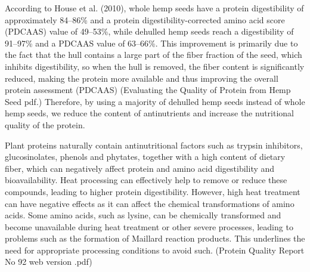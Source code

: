 \vspace{1em}
According to House et al. (2010), whole hemp seeds have a protein digestibility of approximately 84–86\% and a protein digestibility-corrected amino acid score (PDCAAS) value of 49–53\%, while dehulled hemp seeds reach a digestibility of 91–97\% and a PDCAAS value of 63–66\%. This improvement is primarily due to the fact that the hull contains a large part of the fiber fraction of the seed, which inhibits digestibility, so when the hull is removed, the fiber content is significantly reduced, making the protein more available and thus improving the overall protein assessment (PDCAAS) (Evaluating the Quality of Protein from Hemp Seed pdf.) Therefore, by using a majority of dehulled hemp seeds instead of whole hemp seeds, we reduce the content of antinutrients and increase the nutritional quality of the protein.

\vspace{1em}
Plant proteins naturally contain antinutritional factors such as trypsin inhibitors, glucosinolates, phenols and phytates, together with a high content of dietary fiber, which can negatively affect protein and amino acid digestibility and bioavailability. Heat processing can effectively help to remove or reduce these compounds, leading to higher protein digestibility. However, high heat treatment can have negative effects as it can affect the chemical transformations of amino acids. Some amino acids, such as lysine, can be chemically transformed and become unavailable during heat treatment or other severe processes, leading to problems such as the formation of Maillard reaction products. This underlines the need for appropriate processing conditions to avoid such. (Protein Quality Report No 92 web version .pdf)



